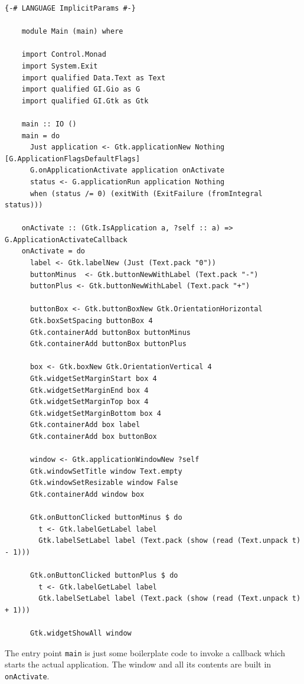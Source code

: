 \documentclass[UdineBachThesis,american,11pt]{PhdThesis}
\begin{document}
  \begin{Verbatim}[gobble=4,fontsize=\small]
    {-# LANGUAGE ImplicitParams #-}

    module Main (main) where

    import Control.Monad
    import System.Exit
    import qualified Data.Text as Text
    import qualified GI.Gio as G
    import qualified GI.Gtk as Gtk

    main :: IO ()
    main = do
      Just application <- Gtk.applicationNew Nothing [G.ApplicationFlagsDefaultFlags]
      G.onApplicationActivate application onActivate
      status <- G.applicationRun application Nothing
      when (status /= 0) (exitWith (ExitFailure (fromIntegral status)))

    onActivate :: (Gtk.IsApplication a, ?self :: a) => G.ApplicationActivateCallback
    onActivate = do
      label <- Gtk.labelNew (Just (Text.pack "0"))
      buttonMinus  <- Gtk.buttonNewWithLabel (Text.pack "-")
      buttonPlus <- Gtk.buttonNewWithLabel (Text.pack "+")

      buttonBox <- Gtk.buttonBoxNew Gtk.OrientationHorizontal
      Gtk.boxSetSpacing buttonBox 4
      Gtk.containerAdd buttonBox buttonMinus
      Gtk.containerAdd buttonBox buttonPlus

      box <- Gtk.boxNew Gtk.OrientationVertical 4
      Gtk.widgetSetMarginStart box 4
      Gtk.widgetSetMarginEnd box 4
      Gtk.widgetSetMarginTop box 4
      Gtk.widgetSetMarginBottom box 4
      Gtk.containerAdd box label
      Gtk.containerAdd box buttonBox

      window <- Gtk.applicationWindowNew ?self
      Gtk.windowSetTitle window Text.empty
      Gtk.windowSetResizable window False
      Gtk.containerAdd window box

      Gtk.onButtonClicked buttonMinus $ do
        t <- Gtk.labelGetLabel label
        Gtk.labelSetLabel label (Text.pack (show (read (Text.unpack t) - 1)))

      Gtk.onButtonClicked buttonPlus $ do
        t <- Gtk.labelGetLabel label
        Gtk.labelSetLabel label (Text.pack (show (read (Text.unpack t) + 1)))

      Gtk.widgetShowAll window
  \end{Verbatim}

  \vspace{-2pt}

  The entry point \mbox{\texttt{main}} is just some boilerplate code to invoke a
  callback which starts the actual application. The window and all its contents
  are built in \mbox{\texttt{onActivate}}.
\end{document}
